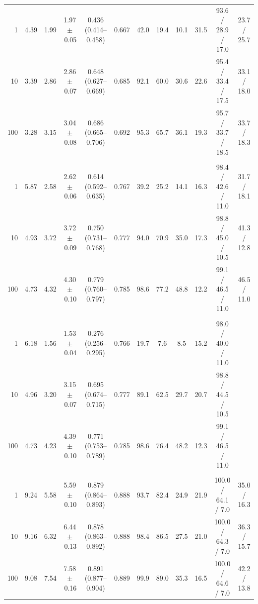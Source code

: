 \begin{table}[tbp]
\begin{tabular}{@{}rccccccccccc@{}}
1 & 4.39 & 1.99 & 1.97\,$\pm$\,0.05 & 0.436 (0.414--0.458) & 0.667 & 42.0 & 19.4 & 10.1 & 31.5 & 93.6 / 28.9 / 17.0 & 23.7 / 25.7\\
10 & 3.39 & 2.86 & 2.86\,$\pm$\,0.07 & 0.648 (0.627--0.669) & 0.685 & 92.1 & 60.0 & 30.6 & 22.6 & 95.4 / 33.4 / 17.5 & 33.1 / 18.0\\
100 & 3.28 & 3.15 & 3.04\,$\pm$\,0.08 & 0.686 (0.665--0.706) & 0.692 & 95.3 & 65.7 & 36.1 & 19.3 & 95.7 / 33.7 / 18.5 & 33.7 / 18.3\\
\addlinespace
\multicolumn{12}{@{}l}{\emph{教室}，$\Npop=80$，$\ncell=148$，1\,m 接触核（平均 4.6 个格点）；$\beta\langle q\rangle/\gamma=4.71$，$\beta\qmax/\gamma=7.14$}\\
1 & 5.87 & 2.58 & 2.62\,$\pm$\,0.06 & 0.614 (0.592--0.635) & 0.767 & 39.2 & 25.2 & 14.1 & 16.3 & 98.4 / 42.6 / 11.0 & 31.7 / 18.1\\
10 & 4.93 & 3.72 & 3.72\,$\pm$\,0.09 & 0.750 (0.731--0.768) & 0.777 & 94.0 & 70.9 & 35.0 & 17.3 & 98.8 / 45.0 / 10.5 & 41.3 / 12.8\\
100 & 4.73 & 4.32 & 4.30\,$\pm$\,0.10 & 0.779 (0.760--0.797) & 0.785 & 98.6 & 77.2 & 48.8 & 12.2 & 99.1 / 46.5 / 11.0 & 46.5 / 11.0\\
\addlinespace
\multicolumn{12}{@{}l}{\emph{教室}，$\Npop=80$，$\ncell=148$，同格接触核；$\beta\langle q\rangle/\gamma=4.71$，$\beta\qmax/\gamma=7.14$}\\
1 & 6.18 & 1.56 & 1.53\,$\pm$\,0.04 & 0.276 (0.256--0.295) & 0.766 & 19.7 & 7.6 & 8.5 & 15.2 & 98.0 / 40.0 / 11.0 & \\
10 & 4.96 & 3.20 & 3.15\,$\pm$\,0.07 & 0.695 (0.674--0.715) & 0.777 & 89.1 & 62.5 & 29.7 & 20.7 & 98.8 / 44.5 / 10.5 & \\
100 & 4.73 & 4.23 & 4.39\,$\pm$\,0.10 & 0.771 (0.753--0.789) & 0.785 & 98.6 & 76.4 & 48.2 & 12.3 & 99.1 / 46.5 / 11.0 & \\
\addlinespace
\multicolumn{12}{@{}l}{\emph{地铁车厢}，$\Npop=310$，$\ncell=270$，1\,m 接触核（平均 11.1 个格点）；$\beta\langle q\rangle/\gamma=9.06$，$\beta\qmax/\gamma=10.00$}\\
1 & 9.24 & 5.58 & 5.59\,$\pm$\,0.10 & 0.879 (0.864--0.893) & 0.888 & 93.7 & 82.4 & 24.9 & 21.9 & 100.0 / 64.1 / 7.0 & 35.0 / 16.3\\
10 & 9.16 & 6.32 & 6.44\,$\pm$\,0.13 & 0.878 (0.863--0.892) & 0.888 & 98.4 & 86.5 & 27.5 & 21.0 & 100.0 / 64.3 / 7.0 & 36.3 / 15.7\\
100 & 9.08 & 7.54 & 7.58\,$\pm$\,0.16 & 0.891 (0.877--0.904) & 0.889 & 99.9 & 89.0 & 35.3 & 16.5 & 100.0 / 64.6 / 7.0 & 42.2 / 13.8\\

\end{tabular}
\end{table}
